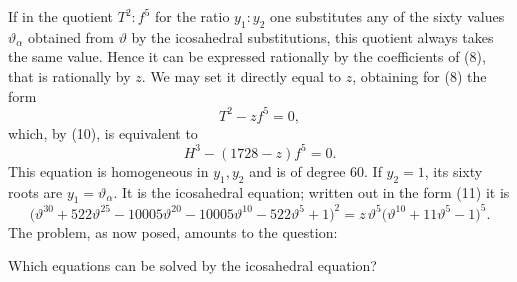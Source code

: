 \documentclass[11pt]{article}
\begin{document}
If in the quotient \(T^2:f^5\) for the ratio \(y_1:y_2\) one substitutes any of the sixty values \(\vartheta_\alpha\) obtained from \(\vartheta\) by the icosahedral substitutions, this quotient always takes the same value. Hence it can be expressed rationally by the coefficients of (8), that is rationally by \(z\). We may set it directly equal to \(z\), obtaining for (8) the form
\begin{equation}
T^2-zf^5=0,
\tag{11}
\end{equation}
which, by (10), is equivalent to
\[
H^3-(1728-z)f^5=0.
\]
This equation is homogeneous in \(y_1,y_2\) and is of degree \(60\). If \(y_2=1\), its sixty roots are \(y_1=\vartheta_\alpha\). It is the icosahedral equation; written out in the form (11) it is
\[
\bigl(\vartheta^{30}+522\vartheta^{25}-10005\vartheta^{20}
-10005\vartheta^{10}-522\vartheta^5+1\bigr)^2
=
z\,\vartheta^5\bigl(\vartheta^{10}+11\vartheta^5-1\bigr)^5.
\]
The problem, as now posed, amounts to the question:

\begin{center}
Which equations can be solved by the icosahedral equation?
\end{center}
\end{document}
